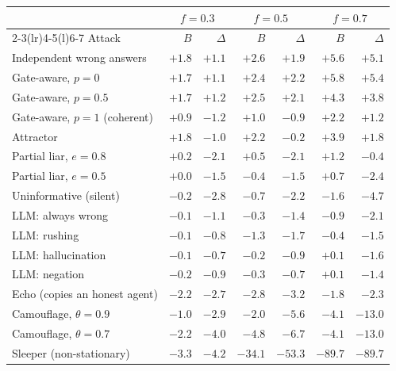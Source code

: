 \begin{tabular}{@{}lrrrrrr@{}}
\toprule
 & \multicolumn{2}{c}{$f=0.3$} & \multicolumn{2}{c}{$f=0.5$} & \multicolumn{2}{c}{$f=0.7$}\\
\cmidrule(lr){2-3}\cmidrule(lr){4-5}\cmidrule(l){6-7}
Attack & $B$ & $\Delta$ & $B$ & $\Delta$ & $B$ & $\Delta$\\
\midrule
Independent wrong answers & $+1.8$ & $+1.1$ & $+2.6$ & $+1.9$ & $+5.6$ & $+5.1$\\
Gate-aware, $p=0$ & $+1.7$ & $+1.1$ & $+2.4$ & $+2.2$ & $+5.8$ & $+5.4$\\
Gate-aware, $p=0.5$ & $+1.7$ & $+1.2$ & $+2.5$ & $+2.1$ & $+4.3$ & $+3.8$\\
Gate-aware, $p=1$ (coherent) & $+0.9$ & $-1.2$ & $+1.0$ & $-0.9$ & $+2.2$ & $+1.2$\\
Attractor & $+1.8$ & $-1.0$ & $+2.2$ & $-0.2$ & $+3.9$ & $+1.8$\\
Partial liar, $e=0.8$ & $+0.2$ & $-2.1$ & $+0.5$ & $-2.1$ & $+1.2$ & $-0.4$\\
Partial liar, $e=0.5$ & $+0.0$ & $-1.5$ & $-0.4$ & $-1.5$ & $+0.7$ & $-2.4$\\
Uninformative (silent) & $-0.2$ & $-2.8$ & $-0.7$ & $-2.2$ & $-1.6$ & $-4.7$\\
LLM: always wrong & $-0.1$ & $-1.1$ & $-0.3$ & $-1.4$ & $-0.9$ & $-2.1$\\
LLM: rushing & $-0.1$ & $-0.8$ & $-1.3$ & $-1.7$ & $-0.4$ & $-1.5$\\
LLM: hallucination & $-0.1$ & $-0.7$ & $-0.2$ & $-0.9$ & $+0.1$ & $-1.6$\\
LLM: negation & $-0.2$ & $-0.9$ & $-0.3$ & $-0.7$ & $+0.1$ & $-1.4$\\
Echo (copies an honest agent) & $-2.2$ & $-2.7$ & $-2.8$ & $-3.2$ & $-1.8$ & $-2.3$\\
Camouflage, $\theta=0.9$ & $-1.0$ & $-2.9$ & $-2.0$ & $-5.6$ & $-4.1$ & $-13.0$\\
Camouflage, $\theta=0.7$ & $-2.2$ & $-4.0$ & $-4.8$ & $-6.7$ & $-4.1$ & $-13.0$\\
Sleeper (non-stationary) & $-3.3$ & $-4.2$ & $-34.1$ & $-53.3$ & $-89.7$ & $-89.7$\\
\bottomrule
\end{tabular}
